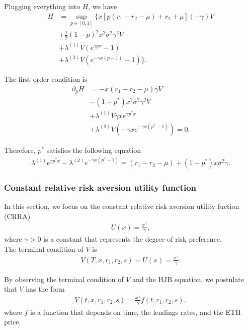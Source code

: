 \documentclass[square]{article} %
\theoremstyle{plain}
\theoremstyle{definition} %
\begin{document}
Plugging everything into $H$, we have
\begin{align*}
H &= \sup_{p\in[0,1]}
\Big\{
x\left[p \left(r_1 - r_2 - \mu \right)+r_2 + \mu \right](-\gamma)V\\
&+ \frac{1}{2} (1-p)^2x^2\sigma^2 \gamma^2 V \\ 
&+\lambda^{(1)} V\left(e^{\gamma px}-1\right) \\ 
&+\lambda^{(2)} V\left(e^{-\gamma x (p-1)}-1\right)
\Big\}.
\end{align*}

The first order condition is
\begin{align*}
  \partial_p H &= 
  -x \left(r_1 - r_2 - \mu \right)\gamma V\\
  &- (1-p^*)x^2\sigma^2 \gamma^2 V \\ 
  &+\lambda^{(1)} V\gamma xe^{\gamma p^*x} \\ 
  &+\lambda^{(2)} V\left(-\gamma x e^{-\gamma x (p^*-1)}\right) = 0.
  \end{align*}

Therefore, $p^*$ satisfies the following equation
\begin{align*}
  \lambda^{(1)} e^{\gamma p^*x}
  - \lambda^{(2)} e^{-\gamma x (p^*-1)} = (r_1 - r_2 - \mu) + (1-p^*)x\sigma^2 \gamma.  
\end{align*}


\subsubsection{Constant relative risk aversion utility function}
In this section, we focus on the constant relative risk aversion utility fuction (CRRA)
\begin{align*}
  U(x) = \frac{x^\gamma}{\gamma}, 
\end{align*}
where $\gamma > 0$ is a constant that represents the degree of risk preference. \\

The terminal condition of $V$ is 
\begin{align*}
V(T, x, r_1, r_2, s) = U(x) = \frac{x^\gamma}{\gamma}.
\end{align*}

By observing the terminal condition of $V$ and the HJB equation, we postulate that $V$ has the form
\begin{align*}
V(t, x, r_1, r_2, s) = \frac{x^\gamma}{\gamma}f(t, r_1, r_2, s),
\end{align*}
where $f$ is a function that depends on time, the lendings rates, and the ETH price. \\
\end{document}
